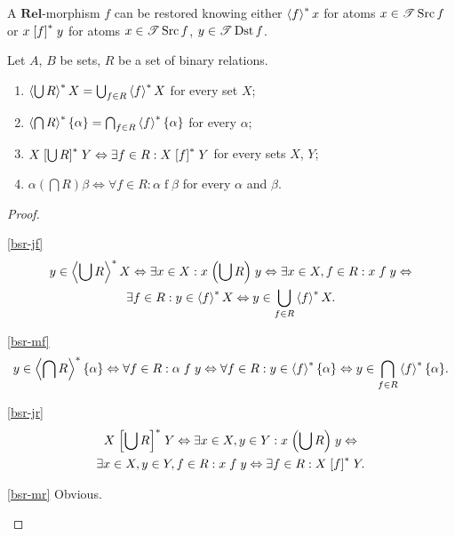 \begin{cor}
A $\mathbf{Rel}$-morphism $f$ can be restored knowing either $\left\langle f\right\rangle ^{\ast}x$
for atoms $x\in\mathscr{T}\operatorname{Src} f$ or $x\mathrel{\left[f\right]^{\ast}}y$ for atoms $x\in\mathscr{T}\operatorname{Src} f$,
$y\in\mathscr{T}\operatorname{Dst} f$.\end{cor}
\begin{prop}
Let $A$, $B$ be sets, $R$ be a set of binary relations.
\begin{enumerate}
\item \textbf{\label{bsr-jf}$\left\langle \bigcup R\right\rangle ^{\ast}X=\bigcup_{f\in R}\left\langle f\right\rangle ^{\ast}X$}
for every set $X$;
\item \label{bsr-mf}$\left\langle \bigcap R\right\rangle ^{\ast}\{\alpha\}=\bigcap_{f\in R}\left\langle f\right\rangle ^{\ast}\{\alpha\}$
for every $\alpha$;
\item \label{bsr-jr}$X\mathrel{\left[\bigcup R\right]^{\ast}}Y\Leftrightarrow\exists f\in R:X\mathrel{\left[f\right]^{\ast}}Y$
for every sets $X$, $Y$;
\item \label{bsr-mr}$\alpha\mathrel{\left(\bigcap R\right)}\beta\Leftrightarrow\forall f\in R:\alpha\mathrel f\beta$
for every $\alpha$ and $\beta$.
\end{enumerate}
\end{prop}
\begin{proof}
~
\begin{widedisorder}
\item [{\ref{bsr-jf}}] ~
\begin{multline*}
y\in\left\langle \bigcup R\right\rangle ^{\ast}X\Leftrightarrow\exists x\in X:x\mathrel{\left(\bigcup R\right)}y\Leftrightarrow\exists x\in X,f\in R:x\mathrel fy\Leftrightarrow\\
\exists f\in R:y\in\left\langle f\right\rangle ^{\ast}X\Leftrightarrow y\in\bigcup_{f\in R}\left\langle f\right\rangle ^{\ast}X.
\end{multline*}

\item [{\ref{bsr-mf}}] ~ 
\[
y\in\left\langle \bigcap R\right\rangle ^{\ast}\{\alpha\}\Leftrightarrow\forall f\in R:\alpha\mathrel fy\Leftrightarrow\forall f\in R:y\in\left\langle f\right\rangle ^{\ast}\{\alpha\}\Leftrightarrow y\in\bigcap_{f\in R}\left\langle f\right\rangle ^{\ast}\{\alpha\}.
\]

\item [{\ref{bsr-jr}}] ~
\begin{multline*}
X\mathrel{\left[\bigcup R\right]^{\ast}}Y\Leftrightarrow\exists x\in X,y\in Y:x\mathrel{\left(\bigcup R\right)}y\Leftrightarrow\\
\exists x\in X,y\in Y,f\in R:x\mathrel fy\Leftrightarrow\exists f\in R:X\mathrel{\left[f\right]^{\ast}}Y.
\end{multline*}

\item [{\ref{bsr-mr}}] Obvious.
\end{widedisorder}
\end{proof}
